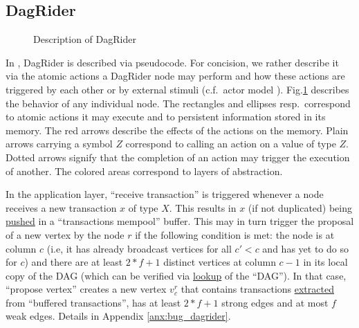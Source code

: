 


\subsection{DagRider\label{ssec:dagrider}}




\begin{figure}[h]
\vspace*{-.4cm}
    \centering
\scalebox{.875}{}
    \caption{Description of DagRider}
    \label{fig:layers_dagrider}
\vspace*{-.4cm}
\end{figure}



In \cite{all_you_need_is_dag}, DagRider is described via pseudocode.
For concision, we rather describe it via the atomic actions a DagRider node may perform and how these actions are triggered by each other or by external stimuli (c.f.~actor model \cite{a_universal_modular_actor_formalism_for_artificial_intelligence}).
Fig.\ref{fig:layers_dagrider} describes the behavior of any individual node. 
The rectangles and ellipses resp.~correspond to atomic actions it may execute and to persistent information stored in its memory.
The red arrows describe the effects of the actions on the memory.
Plain arrows carrying a symbol $Z$ correspond to calling an action on a value of type $Z$. 
Dotted arrows signify that the completion of an action may trigger the execution of another.
The colored areas correspond to layers of abstraction.


In the application layer, ``receive transaction'' is triggered whenever a node receives a new transaction $x$ of type $X$. 
This results in $x$ (if not duplicated) being \ul{pushed} in a ``transactions mempool'' buffer.
This may in turn trigger the proposal of a new vertex by the node $r$ if the following condition is met: the node is at column $c$ (i.e, it has already broadcast vertices for all $c'<c$ and has yet to do so for $c$) and there are at least $2*f+1$ distinct vertices at column $c-1$ in its local copy of the DAG (which can be verified via \ul{lookup} of the ``DAG''). 
In that case, ``propose vertex'' creates a new vertex $v_c^r$ that contains transactions \ul{extracted} from ``buffered transactions'', has at least $2*f+1$ strong edges and at most $f$ weak edges.
Details in Appendix \ref{anx:bug_dagrider}.


